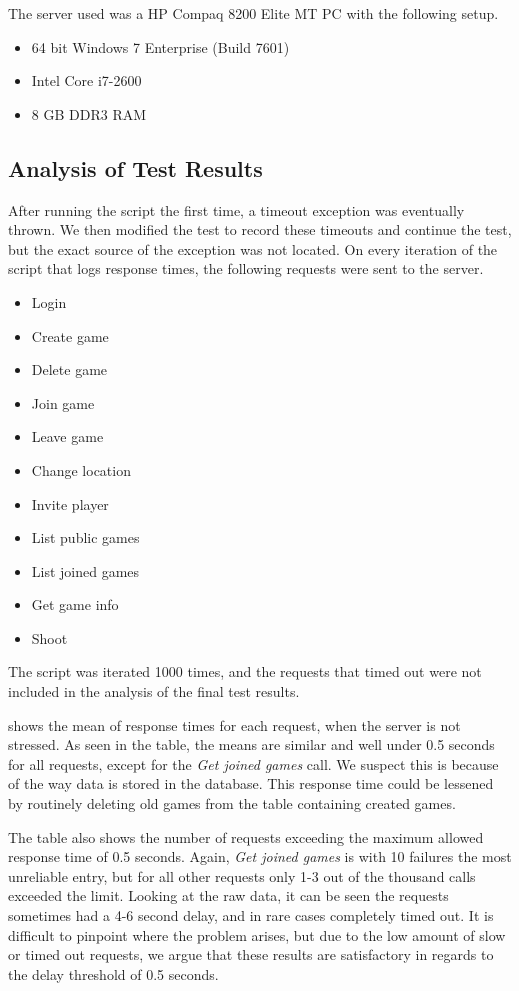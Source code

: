 The server used was a HP Compaq 8200 Elite MT PC with the following setup.

\begin{itemize}
\item 64 bit Windows 7 Enterprise (Build 7601)
\item Intel Core i7-2600
\item 8 GB DDR3 RAM
\end{itemize}

\subsection{Analysis of Test Results}
After running the script the first time, a timeout exception was eventually thrown. We then modified the test to record these timeouts and continue the test, but the exact source of the exception was not located. On every iteration of the script that logs response times, the following requests were sent to the server.

\begin{itemize}
\item Login
\item Create game
\item Delete game
\item Join game
\item Leave game
\item Change location
\item Invite player
\item List public games
\item List joined games
\item Get game info
\item Shoot
\end{itemize}

The script was iterated 1000 times, and the requests that timed out were not included in the analysis of the final test results.

 shows the mean of response times for each request, when the server is not stressed. As seen in the table, the means are similar and well under 0.5 seconds for all requests, except for the \textit{Get joined games} call. We suspect this is because of the way data is stored in the database. This response time could be lessened by routinely deleting old games from the table containing created games.

The table also shows the number of requests exceeding the maximum allowed response time of 0.5 seconds. Again, \textit{Get joined games} is with 10 failures the most unreliable entry, but for all other requests only 1-3 out of the thousand calls exceeded the limit. Looking at the raw data, it can be seen the requests sometimes had a 4-6 second delay, and in rare cases completely timed out. It is difficult to pinpoint where the problem arises, but due to the low amount of slow or timed out requests, we argue that these results are satisfactory in regards to the delay threshold of 0.5 seconds.

